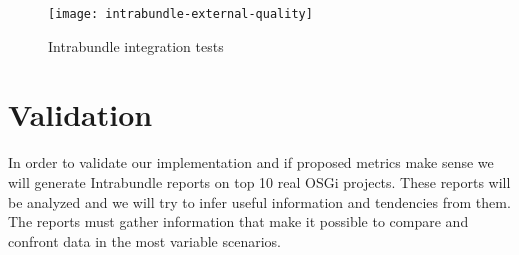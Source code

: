 \begin{figure}[h]
\caption{Intrabundle integration tests}
\label{intrabundle-integ-tests}
\texttt{[image: intrabundle-external-quality]}
\centering
\end{figure}

\FloatBarrier

\section{Validation}
In order to validate our implementation and if proposed metrics make sense we will generate Intrabundle reports on top 10 real OSGi projects. These reports will be analyzed and we will try to infer useful information and tendencies from them. The reports must gather information that make it possible to compare and confront data in the most variable scenarios.